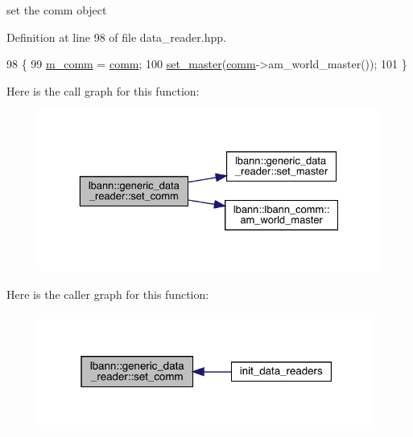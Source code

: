 set the comm object 



Definition at line 98 of file data\+\_\+reader.\+hpp.


\begin{DoxyCode}
98                                   \{
99     \hyperlink{classlbann_1_1generic__data__reader_ad3976d4b7db2d404dbb87a56c33fd456}{m\_comm} = \hyperlink{file__io_8cpp_ab048c6f9fcbcfaa57ce68b00263dbebe}{comm};
100     \hyperlink{classlbann_1_1generic__data__reader_a343f7d791a04aa1ef30ff829a899e2ae}{set\_master}(\hyperlink{file__io_8cpp_ab048c6f9fcbcfaa57ce68b00263dbebe}{comm}->am\_world\_master());
101   \}
\end{DoxyCode}
Here is the call graph for this function\+:\nopagebreak
\begin{figure}[H]
\begin{center}
\leavevmode
\includegraphics[width=329pt]{classlbann_1_1generic__data__reader_a39f4d80661a2c8e24d8d167ad5bd6c6b_cgraph}
\end{center}
\end{figure}
Here is the caller graph for this function\+:\nopagebreak
\begin{figure}[H]
\begin{center}
\leavevmode
\includegraphics[width=313pt]{classlbann_1_1generic__data__reader_a39f4d80661a2c8e24d8d167ad5bd6c6b_icgraph}
\end{center}
\end{figure}
\mbox{\label{classlbann_1_1generic__data__reader_a960362f819312d39dfcba5eeecf76257}} 
